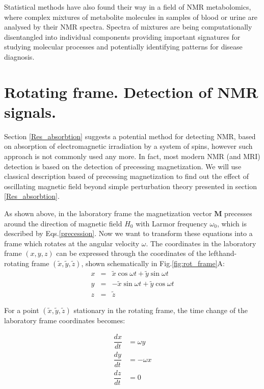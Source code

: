 \documentclass[a4paper, 12pt]{article}
\begin{document}
  Statistical methods have also found their way in a field of NMR metabolomics, where complex mixtures of metabolite molecules in samples of blood or urine are analysed by their NMR spectra. Spectra of mixtures are being computationally disentangled into individual components providing important signatures for studying molecular processes and potentially identifying patterns for disease diagnosis.

\section{Rotating frame. Detection of NMR signals.}

 Section \ref{Res_absorbtion} suggests a potential method for detecting NMR, based on absorption of electromagnetic irradiation by a system of spins, however such approach is not commonly used any more. In fact, most modern NMR (and MRI) detection is based on the detection of precessing magnetization. We will use classical description based of precessing magnetization to find out the effect of oscillating magnetic field beyond simple perturbation theory presented in section \ref{Res_absorbtion}.
 
  As shown above, in the laboratory frame the magnetization vector $\bm{M}$ precesses around the direction of magnetic field $H_0$ with Larmor frequency $\omega_0$, which is described by Eqs.\ref{precession}. Now we  want to transform these equations into a frame which rotates at the angular velocity $\omega$.  The coordinates in the laboratory frame $(x,y,z)$ can be expressed through the coordinates of the lefthand-rotating frame $(\tilde{x}, \tilde{y}, \tilde{z})$, shown schematically in Fig.\ref{fig:rot_frame}A:
\begin{equation}
\begin{array}{lcl}
x &=& \tilde{x} \cos \omega t + \tilde{y} \sin \omega t \\
y &=& -\tilde{x} \sin \omega t + \tilde{y} \cos \omega t \\
z &=& \tilde{z}
\end{array}
\end{equation}

For a point $(\tilde{x},\tilde{y},\tilde{z})$ stationary in the rotating frame, the time change of the laboratory frame coordinates becomes:

\begin{equation} \label{eq:rotating_frame_derivative}
\begin{array}{lcl}
\dfrac{dx}{dt} &= \omega {y}  \\
\dfrac{dy}{dt} &= -\omega {x}  \\
\dfrac{dz}{dt} &= 0  \\
\end{array}
\end{equation} 
\end{document}
